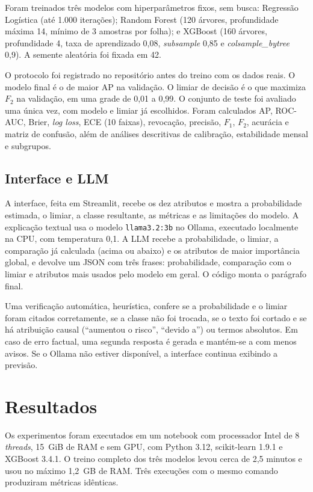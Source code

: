 \documentclass[12pt]{article}
\begin{document}
Foram treinados três modelos com hiperparâmetros fixos, sem busca:
Regressão Logística (até 1.000 iterações); Random Forest (120 árvores,
profundidade máxima 14, mínimo de 3 amostras por folha); e XGBoost (160
árvores, profundidade 4, taxa de aprendizado 0,08, \textit{subsample} 0,85 e
\textit{colsample\_bytree} 0,9). A semente aleatória foi fixada em 42.

O protocolo foi registrado no repositório antes do treino com os dados reais. O
modelo final é o de maior AP na validação. O limiar de decisão é o que maximiza
$F_2$ na validação, em uma grade de 0,01 a 0,99. O conjunto de teste foi
avaliado uma única vez, com modelo e limiar já escolhidos. Foram calculados AP,
ROC-AUC, Brier, \textit{log loss}, ECE (10 faixas), revocação, precisão, $F_1$,
$F_2$, acurácia e matriz de confusão, além de análises descritivas de
calibração, estabilidade mensal e subgrupos.

\subsection{Interface e LLM}

A interface, feita em Streamlit, recebe os dez atributos e mostra a
probabilidade estimada, o limiar, a classe resultante, as métricas e as
limitações do modelo. A explicação textual usa o modelo \texttt{llama3.2:3b} no
Ollama, executado localmente na CPU, com temperatura 0,1. A LLM recebe a
probabilidade, o limiar, a comparação já calculada (acima ou abaixo) e os
atributos de maior importância global, e devolve um JSON com três frases:
probabilidade, comparação com o limiar e atributos mais usados pelo modelo em
geral. O código monta o parágrafo final.

Uma verificação automática, heurística, confere se a probabilidade e o limiar
foram citados corretamente, se a classe não foi trocada, se o texto foi cortado e
se há atribuição causal (``aumentou o risco'', ``devido a'') ou termos absolutos.
Em caso de erro factual, uma segunda resposta é gerada e mantém-se a com menos
avisos. Se o Ollama não estiver disponível, a interface continua exibindo a
previsão.


\section{Resultados}\label{sec:resultados}

Os experimentos foram executados em um notebook com processador Intel de 8
\textit{threads}, 15~GiB de RAM e sem GPU, com Python 3.12, scikit-learn 1.9.1 e
XGBoost 3.4.1. O treino completo dos três modelos levou cerca de 2,5 minutos e
usou no máximo 1,2~GB de RAM. Três execuções com o mesmo comando produziram
métricas idênticas.
\end{document}
